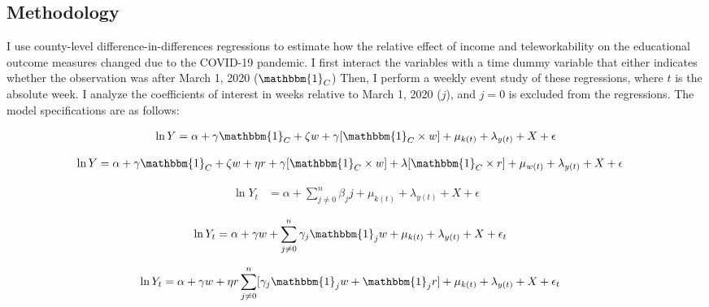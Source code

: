 \subsection{Methodology}
I use county-level difference-in-differences regressions to estimate how the relative effect of income and teleworkability on the educational outcome measures changed due to the COVID-19 pandemic.
I first interact the variables with a time dummy variable that either indicates whether the observation was after March 1, 2020 ($\mathbbm{1}_C$)
Then, I perform a weekly event study of these regressions, where $t$ is the absolute week.
I analyze the coefficients of interest in weeks relative to March 1, 2020 ($j$), and $j=0$ is excluded from the regressions.
The model specifications are as follows: \par

\begin{align} \label{incalone}
    \ln Y &=  \alpha + \gamma \mathbbm{1}_{C} + \zeta w  + \gamma [\mathbbm{1}_C\times w] + \mu_{k\left(t\right)}+\lambda_{y\left(t\right)}+ X + \epsilon  \\
\end{align}

\begin{align} \label{inctele}
\ln Y &=  \alpha + \gamma \mathbbm{1}_{C} + \zeta w + \eta r  + \gamma[\mathbbm{1}_{C}\times w]
+ \lambda[\mathbbm{1}_{C}\times r] +\mu_{w\left(t\right)}+\lambda_{y\left(t\right)}+ X + \epsilon
\end{align}

\begin{align} \label{week}
\ln Y_t &=  \alpha +\sum_{j\neq0}^{n}\beta_j j +\mu_{k(t)}+\lambda_{y(t)}+ X + \epsilon
\end{align}

\begin{align} \label{incaloneweek}
    \ln Y_t &=  \alpha + \gamma w + \sum_{j\neq0}^{n}\gamma_j \mathbbm{1}_j w +\mu_{k(t)}+\lambda_{y(t)}+X+\epsilon_t
\end{align}

\begin{align} \label{incteleweek}
    \ln Y_t &=  \alpha + \gamma w + \eta r \sum_{j\neq0}^{n}[\gamma_j \mathbbm{1}_j w + \mathbbm{1}_j r] +\mu_{k(t)}+\lambda_{y(t)}+X+\epsilon_t
\end{align}

